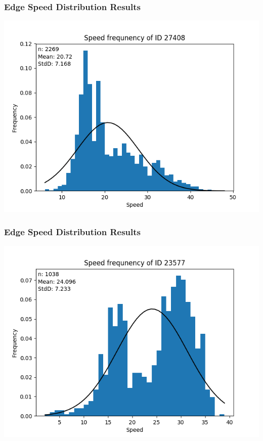 \documentclass{beamer}
\begin{document}
	\begin{frame}
		\frametitle{Edge Speed Distribution Results}
		\includegraphics[width=\textwidth,height=\textheight,keepaspectratio]{logResEh2.png}
	\end{frame}
	\begin{frame}
		\frametitle{Edge Speed Distribution Results}
		\includegraphics[width=\textwidth,height=\textheight,keepaspectratio]{logResBad.png}
	\end{frame}
\end{document}
